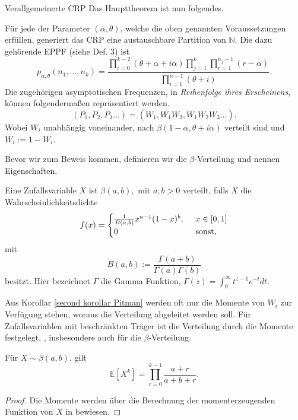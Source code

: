 \begin{section}{Verallgemeinerte CRP}
Das Haupttheorem ist nun folgendes.
\begin{theorem}
    \label{Main theorem CRP}
    Für jede der Parameter $(\alpha,\theta)$, welche die oben genannten Voraussetzungen erfüllen, generiert das CRP eine austauschbare  Partition von $\mathbb{N}$. Die dazu gehörende EPPF (siehe Def. 3) ist 
    \begin{equation}
   p_{\alpha,\theta}(n_1,...,n_k) = \frac{\displaystyle \prod_{i=0}^{k-2}(\theta + \alpha + i\alpha)\prod_{j=1}^{k}\prod_{r=1}^{n_j-1}(r-\alpha)}{\displaystyle\prod_{i=1}^{n-1}(\theta  + i)}.
    \end{equation}
    Die zugehörigen asymptotischen Frequenzen, in \textit{Reihenfolge ihres Erscheinens}, können folgendermaßen repräsentiert werden.
    \[
    (P_1,P_2,P_3...) = (W_1,\bar{W_1}W_2,\bar{W_1}\bar{W_2}W_3...).
    \]
    Wobei $W_i$ unabhängig voneinander, nach $\beta(1 - \alpha, \theta + i\alpha)$ verteilt sind und $\bar{W_i}:= 1 - W_i$.
\end{theorem} 
Bevor wir zum Beweis kommen, definieren wir die $\beta$-Verteilung und nennen Eigenschaften.
\begin{Definition}
    Eine Zufallsvariable $X$ ist $\beta(a,b),$ mit $ a,b > 0 $ verteilt, falls $X$ die Wahrscheinlichkeitsdichte 
    \[
        f(x) =
        \begin{cases}
        \frac{1}{B(a,b)} x^{a-1}(1-x)^{b}, \hspace{5pt} &x \in [0,1]  \\
        0 &\textnormal{sonst},
        \end{cases} 
   \]
mit 
\[
    B(a,b):= \frac{\Gamma(a+b)}{\Gamma(a)\Gamma(b)}
\]
besitzt. Hier bezeichnet $\Gamma$ die Gamma Funktion, $\Gamma(z)= \int_{0}^{\infty} t^{z-1}e^{-t}dt$.
\end{Definition}
Aus Korollar \ref{second korollar Pitman} werden oft nur die Momente von $W_i$ zur Verfügung stehen, woraus die Verteilung abgeleitet werden soll. Für Zufallsvariablen mit beschränkten Träger ist die Verteilung durch die Momente festgelegt, \cite[Theorem 30.1]{billingsley1995probability}, insbesondere auch für die $\beta$-Verteilung.
\begin{lemma}
    Für $X \sim \beta(a,b)$, gilt
    \[
    \mathbb{E}[X^k] = \prod_{r=0}^{k-1}\frac{a+r}{a+b  + r}.
    \]
\end{lemma}
\begin{proof}
    Die Momente werden über die Berechnung der momenterzeugenden Funktion von $X$ in \cite[Kapitel 25]{johnson1995continuous} bewiesen. 
\end{proof}


\end{section}
